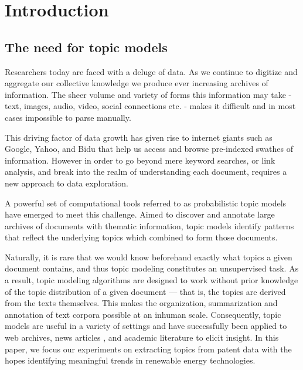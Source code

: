 
\chapter{Introduction} %

\label{Chapter1} %

\newcommand{\keyword}[1]{\textbf{#1}}
\newcommand{\tabhead}[1]{\textbf{#1}}
\newcommand{\code}[1]{\texttt{#1}}
\newcommand{\file}[1]{\texttt{\bfseries#1}}
\newcommand{\option}[1]{\texttt{\itshape#1}}


\section{The need for topic models}
Researchers today are faced with a deluge of data. As we continue to digitize and aggregate our collective knowledge we produce ever increasing archives of information. The sheer volume and variety of forms this information may take - text, images, audio, video, social connections etc. - makes it difficult and in most cases impossible to parse manually. 

This driving factor of data growth has given rise to internet giants such as Google, Yahoo, and Bidu that help us access and browse pre-indexed swathes of information. However in order to go beyond mere keyword searches, or link analysis, and break into the realm of understanding each document, requires a new approach to data exploration.

A powerful set of computational tools referred to as probabilistic topic models have emerged to meet this challenge. Aimed to discover and annotate large archives of documents with thematic information, topic models identify patterns that reflect the underlying topics which combined to form those documents.

Naturally, it is rare that we would know beforehand exactly what topics a given document contains, and thus topic modeling constitutes an unsupervised task. As a result, topic modeling algorithms are designed to work without prior knowledge of the topic distribution of a given document — that is, the topics are derived from the texts themselves. This makes the organization, summarization and annotation of text corpora possible at an inhuman scale. Consequently, topic models are useful in a variety of settings and have successfully been applied to web archives, news articles \parencite{Newman:2006:AET:2106961.2106971}, and academic literature \parencite{Steyvers:2004:PAM:1014052.1014087} to elicit insight. In this paper, we focus our experiments on extracting topics from patent data with the hopes identifying meaningful trends in renewable energy technologies. 

